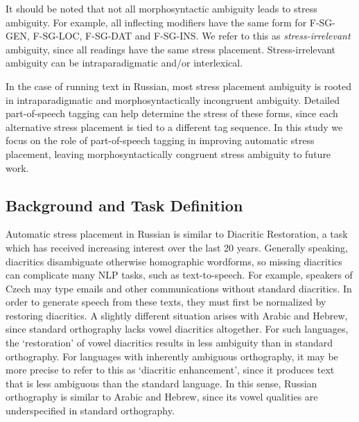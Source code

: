 \documentclass[11pt]{article}
\newcommand{\rr}[1]{\marginpar{\scriptsize R: #1}} %
\begin{document}
It should be noted that not all morphosyntactic ambiguity leads to stress 
ambiguity. For example, all inflecting modifiers have the same form for F-SG-GEN, 
F-SG-LOC, F-SG-DAT and F-SG-INS. We refer to this as \emph{stress-irrelevant} 
ambiguity, since all readings have
the same stress placement. Stress-irrelevant ambiguity can be intraparadigmatic 
and/or interlexical. 

In the case of running 
text in Russian, most stress placement 
ambiguity is rooted in intraparadigmatic and morphosyntactically incongruent 
ambiguity. Detailed part-of-speech tagging can help determine the stress of 
these forms, since each alternative stress placement is tied to a different
tag sequence. In this study we focus on 
the role of part-of-speech tagging in improving
automatic stress placement, leaving morphosyntactically congruent stress 
ambiguity to future work. \rr{this paragraph is choppy.}

\subsection{Background and Task Definition}

Automatic stress placement in Russian is similar to Diacritic Restoration, a task
which has received increasing interest over the last 20 years. Generally 
speaking, diacritics disambiguate otherwise homographic wordforms, so missing 
diacritics can complicate many NLP tasks, such as text-to-speech. For example, 
speakers of Czech may type emails and other communications
without standard diacritics. In order to generate speech from these texts, they 
must first be normalized by restoring diacritics. A slightly different
situation arises with Arabic and Hebrew, since standard orthography lacks vowel 
diacritics altogether. For such languages, the `restoration' of vowel diacritics 
results in less ambiguity than in standard orthography. For languages with 
inherently ambiguous orthography,
it may be more precise to refer to this as `diacritic enhancement', since it 
produces text that is less ambiguous than the standard language. In this sense, 
Russian orthography is similar to Arabic and Hebrew, since its vowel qualities 
are underspecified in standard orthography.
\end{document}
